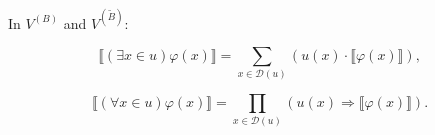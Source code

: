 In $V^{(B)}$ and $V^{(\tilde{B})}$:

$$\llbracket (\exists x \in u) \varphi(x) \rrbracket = \sum_{x \in \mathcal{D}(u)} (u(x) \cdot \llbracket \varphi(x) \rrbracket),$$

$$\llbracket (\forall x \in u) \varphi(x) \rrbracket = \prod_{x \in \mathcal{D}(u)} (u(x) \Rightarrow \llbracket \varphi(x) \rrbracket).$$
